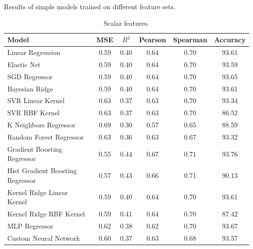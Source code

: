 \begin{table}[ht]
    \centering
    \caption{Results of simple models trained on different feature sets.}
    \label{tab:simple_models_results}

    \begin{subtable}[t]{\textwidth}
        \centering
        \begin{tabular}{|l|c|c|c|c|c|}
            \hline
            Model & MSE & $R^2$ & Pearson & Spearman & Accuracy \\
            \hline
            Linear Regression                & 0.59 & 0.40 & 0.64 & 0.70 & 93.61 \\
            Elastic Net                      & 0.59 & 0.40 & 0.64 & 0.70 & 93.59 \\
            SGD Regressor                    & 0.59 & 0.40 & 0.64 & 0.70 & 93.65 \\
            Bayesian Ridge                   & 0.59 & 0.40 & 0.64 & 0.70 & 93.61 \\
            SVR Linear Kernel                & 0.63 & 0.37 & 0.63 & 0.70 & 93.34 \\
            SVR RBF Kernel                   & 0.63 & 0.37 & 0.63 & 0.70 & 86.52 \\
            K Neighbors Regressor            & 0.69 & 0.30 & 0.57 & 0.65 & 88.59 \\
            Random Forest Regressor          & 0.63 & 0.36 & 0.63 & 0.67 & 93.32 \\
            Gradient Boosting Regressor      & 0.55 & 0.44 & 0.67 & 0.71 & 93.76 \\
            Hist Gradient Boosting Regressor & 0.57 & 0.43 & 0.66 & 0.71 & 90.13 \\
            Kernel Ridge Linear Kernel       & 0.59 & 0.40 & 0.64 & 0.70 & 93.61 \\
            Kernel Ridge RBF Kernel          & 0.59 & 0.41 & 0.64 & 0.70 & 87.42 \\
            MLP Regressor                    & 0.62 & 0.38 & 0.62 & 0.70 & 93.67 \\
            Custom Neural Network            & 0.60 & 0.37 & 0.63 & 0.68 & 93.57 \\
            \hline
        \end{tabular}
        \caption{Scalar features.}
        \label{tab:simple_models_results_no_embeddings}
    \end{subtable}      
    

\end{table}
